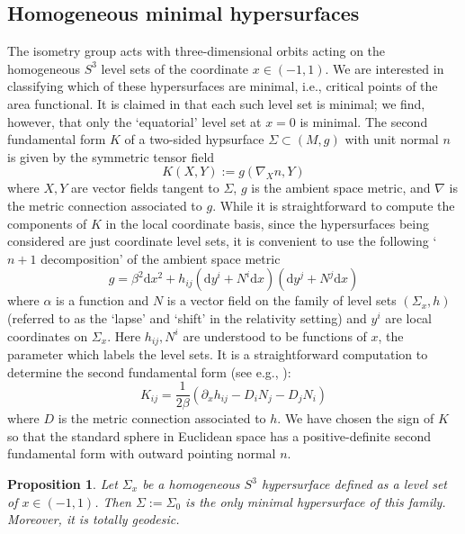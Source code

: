 \documentclass[11pt]{amsart}
\theoremstyle{plain}
\newtheorem{prop}[theorem]{Proposition}
\newcommand{\td}{\text{d}}
\theoremstyle{definition}
\numberwithin{equation}{section}
\begin{document}
\subsection{Homogeneous minimal hypersurfaces}
The isometry group acts with three-dimensional orbits acting on the homogeneous $S^3$ level sets of the coordinate $x \in (-1,1)$. We are interested in classifying which of these hypersurfaces are minimal, i.e., critical points of the area functional. It is claimed in \cite{KalafatSari} that each such level set is minimal; we find, however, that only the `equatorial' level set at $x =0$ is minimal. The second fundamental form $K$ of a two-sided hypsurface $\Sigma \subset (M,g)$ with unit normal $n$ is given by the symmetric tensor field
\begin{equation}
    K(X,Y):=g(\nabla_X n, Y)
\end{equation} where $X,Y$ are vector fields tangent to $\Sigma$, $g$ is the ambient space metric, and $\nabla$ is the metric connection associated to $g$. While it is straightforward to compute the components of $K$ in the local coordinate basis, since the hypersurfaces being considered are just coordinate level sets, it is convenient to use the following `$n+1$ decomposition' of the ambient space metric
\begin{equation}\label{ADM}
    g = \beta^2 \td x^2 + h_{ij} (\td y^i + N^i \td x)(\td y^j + N^j \td x)
\end{equation} where $\alpha$ is a function and $N$ is a vector field on the family of level sets $(\Sigma_x,h)$ (referred to as the `lapse' and `shift' in the relativity setting) and $y^i$ are local coordinates on $\Sigma_x$. Here $h_{ij}, N^i$ are understood to be functions of $x$, the parameter which labels the level sets.  It is a straightforward computation to determine the second fundamental form
(see e.g., \cite[Section 2.3]{Alcubierre}): 
\begin{equation}\label{2FF}
    K_{ij} = \frac{1}{2\beta} \left(\partial_x h_{ij} - D_i N_j - D_j N_i\right)
\end{equation} where $D$ is the metric connection associated to $h$. We have chosen the sign of $K$ so that the standard sphere in Euclidean space has a positive-definite second fundamental form with outward pointing normal $n$.
\begin{prop}\label{Minpage} Let $\Sigma_x$ be a homogeneous $S^3$ hypersurface defined as a level set of $x \in (-1,1)$. Then $\Sigma:=\Sigma_0$ is the only minimal hypersurface of this family. Moreover, it is totally geodesic. 
\end{prop}
\end{document}
